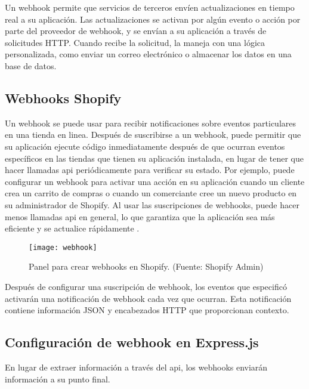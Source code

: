 Un webhook permite que servicios de terceros envíen actualizaciones en tiempo real a su aplicación. Las actualizaciones se activan por algún evento o acción por parte del proveedor de webhook, y se envían a su aplicación a través de solicitudes HTTP. Cuando recibe la solicitud, la maneja con una lógica personalizada, como enviar un correo electrónico o almacenar los datos en una base de datos.

\subsection{Webhooks Shopify}
Un webhook se puede usar para recibir notificaciones sobre eventos particulares en una tienda en linea. Después de suscribirse a un webhook, puede permitir que su aplicación ejecute código inmediatamente después de que ocurran eventos específicos en las tiendas que tienen su aplicación instalada, en lugar de tener que hacer llamadas \acrshort{api} periódicamente para verificar su estado. Por ejemplo, puede configurar un webhook para activar una acción en su aplicación cuando un cliente crea un carrito de compras o cuando un comerciante cree un nuevo producto en su administrador de Shopify. Al usar las suscripciones de webhooks, puede hacer menos llamadas \acrshort{api} en general, lo que garantiza que la aplicación sea más eficiente y se actualice rápidamente \cite{webhook}.
\vspace{0.8cm}

\begin{figure}[H]
  \centering
  \texttt{[image: webhook]}
  \caption{Panel para crear webhooks en Shopify. (Fuente: Shopify Admin)}
\end{figure}

Después de configurar una suscripción de webhook, los eventos que especificó activarán una notificación de webhook cada vez que ocurran. Esta notificación contiene información JSON y encabezados HTTP que proporcionan contexto.

\newpage
\subsection{Configuración de webhook en Express.js}
En lugar de extraer información a través del \acrshort{api}, los webhooks enviarán información a su punto final.
\vspace{0.8cm}

